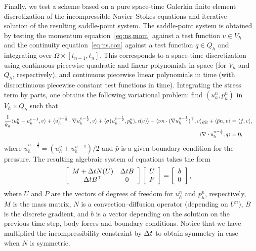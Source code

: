 Finally, we test a scheme based on a pure space-time Galerkin finite
element discretization of the incompressible Navier--Stokes equations
and iterative solution of the resulting saddle-point system. The
saddle-point system is obtained by testing the momentum
equation~\eqref{eq:ns,mom} against a test function $v \in V_h$ and the
continuity equation~\eqref{eq:ns,con} against a test function $q \in
Q_h$ and integrating over $\Omega \times [t_{n-1}, t_n]$. This
corresponds to a space-time discretization using continuous piecewise
quadratic and linear polynomials in space (for $V_h$ and $Q_h$,
respectively), and continuous piecewise linear polynomials in time
(with discontinuous piecewise constant test functions in
time). Integrating the stress term by parts, one obtains the following
variational problem: find $(u^n_h, p^n_h)$ in $V_h \times Q_h$ such
that
\begin{align}
    \frac{1}{k_n} \renni{v}{u^n_h - u^{n-1}_h}
    + \renni{v}{u^{n-\frac{1}{2}}_h \cdot \nabla u^{n-\frac{1}{2}}_h}
    + \renni{\epsilon(v)}{\sigma(u^{n-\frac{1}{2}}_h, p^n_h)}
    - \renni{v}{\nu n \cdot (\nabla u^{n-\frac{1}{2}}_h)^{\top}}_{\partial \Omega}
    + \renni{v}{\bar{p}n} &= \renni{v}{f}, \\
    \renni{q}{\nabla \cdot u^{n-\frac{1}{2}}_h} &= 0,
\end{align}
where $u^{n-\frac{1}{2}}_h = ({u}^n_h + {u}^{n-1}_h) / 2$ and $\bar{p}$ is a
given boundary condition for the pressure. The resulting algebraic
system of equations takes the form
\begin{equation}
\left[
\begin{array}{cc}
M + \deltat N(U) & \deltat B \\
\deltat B^{\top} & 0
\end{array}
\right]
\left[
\begin{array}{c}
U \\ P
\end{array}
\right]
=
\left[
\begin{array}{c}
b\\ 0
\end{array}
\right],
\label{timestepping}
\end{equation}
where $U$ and $P$ are the vectors of degrees of freedom for $u^n_h$
and $p^n_h$, respectively, $M$ is the mass matrix, $N$ is a
convection--diffusion operator (depending on $U^n$), $B$ is the
discrete gradient, and $b$ is a vector depending on the solution on
the previous time step, body forces and boundary conditions. Notice
that we have multiplied the incompressibility constraint by $\deltat$
to obtain symmetry in case when $N$ is symmetric.

